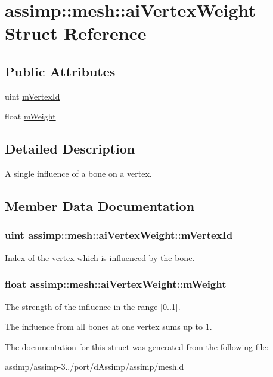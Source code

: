 \hypertarget{structassimp_1_1mesh_1_1ai_vertex_weight}{\section{assimp\+:\+:mesh\+:\+:ai\+Vertex\+Weight Struct Reference}
\label{structassimp_1_1mesh_1_1ai_vertex_weight}
}
\subsection*{Public Attributes}
\begin{DoxyCompactItemize}
\item 
uint \hyperlink{structassimp_1_1mesh_1_1ai_vertex_weight_ab163841751fe8737f4ff533263a5ee72}{m\+Vertex\+Id}
\item 
float \hyperlink{structassimp_1_1mesh_1_1ai_vertex_weight_ab2ac7dec52e63ab5a7a029fd9bfe6220}{m\+Weight}
\end{DoxyCompactItemize}


\subsection{Detailed Description}
A single influence of a bone on a vertex. 

\subsection{Member Data Documentation}
\hypertarget{structassimp_1_1mesh_1_1ai_vertex_weight_ab163841751fe8737f4ff533263a5ee72}{
\subsubsection[{m\+Vertex\+Id}]{\setlength{\rightskip}{0pt plus 5cm}uint assimp\+::mesh\+::ai\+Vertex\+Weight\+::m\+Vertex\+Id}}\label{structassimp_1_1mesh_1_1ai_vertex_weight_ab163841751fe8737f4ff533263a5ee72}
\hyperlink{struct_index}{Index} of the vertex which is influenced by the bone. \hypertarget{structassimp_1_1mesh_1_1ai_vertex_weight_ab2ac7dec52e63ab5a7a029fd9bfe6220}{
\subsubsection[{m\+Weight}]{\setlength{\rightskip}{0pt plus 5cm}float assimp\+::mesh\+::ai\+Vertex\+Weight\+::m\+Weight}}\label{structassimp_1_1mesh_1_1ai_vertex_weight_ab2ac7dec52e63ab5a7a029fd9bfe6220}
The strength of the influence in the range {\ttfamily \mbox{[}0..1\mbox{]}}.

The influence from all bones at one vertex sums up to 1. 

The documentation for this struct was generated from the following file\+:\begin{DoxyCompactItemize}
\item 
assimp/assimp-\/3../port/d\+Assimp/assimp/mesh.\+d\end{DoxyCompactItemize}
